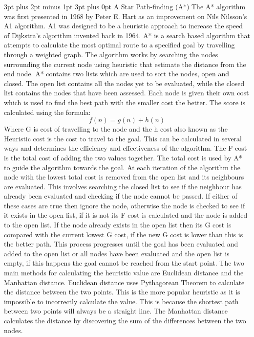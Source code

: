 \documentclass[12pt,a4paper,oneside]{book}
\makeatletter
\renewcommand\subsection{\@startsection {subsection}{1}{2mm} %
                               {3pt plus 2pt minus 1pt} %
                               {3pt plus 0pt} %
                               {\normalfont\bfseries}}
\makeatother
\begin{document}
\subsection{A Star Path-finding (A*)}
The A* algorithm was first presented in 1968 by Peter E. Hart as an improvement on Nils Nilsson’s A1 algorithm. A1 was designed to be a heuristic approach to increase the speed of Dijkstra’s algorithm invented back in 1964. A* is a search based algorithm that attempts to calculate the most optimal route to a specified goal by travelling through a weighted graph. 
\vspace{5mm} 
\newline
The algorithm works by searching the nodes surrounding the current node using heuristic that estimate the distance from the end node.  A* contains two lists which are used to sort the nodes, open and closed. The open list contains all the nodes yet to be evaluated, while the closed list contains the nodes that have been assessed. Each node is given their own cost which is used to find the best path with the smaller cost the better. The score is calculated using the formula:
\[f(n) = g(n) + h(n)\]  
Where G is cost of travelling to the node and the h cost also known as the Heuristic cost is the cost to travel to the goal. This can be calculated in several ways and determines the efficiency and effectiveness of the algorithm. The F cost is the total cost of adding the two values together.
\vspace{5mm} 
\newline
The total cost is used by A* to guide the algorithm towards the goal. At each iteration of the algorithm the node with the lowest total cost is removed from the open list and its neighbours are evaluated. This involves searching the closed list to see if the neighbour has already been evaluated and checking if the node cannot be passed. If either of these cases are true then ignore the node, otherwise the node is checked to see if it exists in the open list, if it is not its F cost is calculated and the node is added to the open list. If the node already exists in the open list then its G cost is compared with the current lowest G cost, if the new G cost is lower than this is the better path. This process progresses until the goal has been evaluated and added to the open list or all nodes have been evaluated and the open list is empty, if this happens the goal cannot be reached from the start point.
\vspace{5mm} 
\newline
The two main methods for calculating the heuristic value are Euclidean distance and the Manhattan distance. Euclidean distance uses  Pythagorean Theorem to calculate the distance between the two points. This is the more popular heuristic as it is impossible to incorrectly calculate the value. This is because the shortest path between two points will always be a straight line. The Manhattan distance calculates the distance by discovering the sum of the differences between the two nodes.
\vspace{5mm} 
\newline
\end{document}
